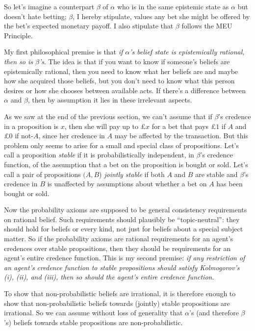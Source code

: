 So let's imagine a counterpart $\beta$ of $\alpha$ who is in the same
epistemic state as $\alpha$ but doesn't hate betting; $\beta$, I
hereby stipulate, values any bet she might be offered by the bet's
expected monetary payoff. I also stipulate that $\beta$ follows the
MEU Principle.

My first philosophical premise is that \emph{if $\alpha$'s belief state is
  epistemically rational, then so is $\beta$'s}. The idea is that if you want to
know if someone's beliefs are epistemically rational, then you need to know what
her beliefs are and maybe how she acquired those beliefs, but you don't need to
know what this person desires or how she chooses between available acts.
If there's a difference between $\alpha$ and $\beta$, then by assumption it lies
in these irrelevant aspects.

As we saw at the end of the previous section, we can't assume that if
$\beta$'s credence in a proposition is $x$, then she will pay up to
£$x$ for a bet that pays £$1$ if $A$ and £0 if not-$A$, since her
credence in $A$ may be affected by the transaction. But this problem
only seems to arise for a small and special class of propositions.
Let's call a proposition \emph{stable} if it is probabilistically
independent, in $\beta$'s credence function, of the assumption that a
bet on the proposition is bought or sold. Let's call a pair of
propositions $(A,B$) \emph{jointly stable} if both $A$ and $B$ are
stable and $\beta$'s credence in $B$ is unaffected by assumptions
about whether a bet on $A$ has been bought or sold.

Now the probability axioms are supposed to be general consistency
requirements on rational belief. Such requirements should plausibly be
``topic-neutral'': they should hold for beliefs or every kind, not
just for beliefs about a special subject matter. So if the probability
axioms are rational requirements for an agent's credences over stable
propositions, then they should be requirements for an agent's
entire credence function. This is my second premise: \emph{if any
  restriction of an agent's credence function to stable propositions
  should satisfy Kolmogorov's (i), (ii), and (iii), then so should the
  agent's entire credence function}.

To show that non-probabilistic beliefs are irrational, it is therefore
enough to show that non-probabilistic beliefs towards (jointly) stable
propositions are irrational. So we can assume without loss of
generality that $\alpha$'s (and therefore $\beta$'s) beliefs towards
stable propositions are non-probabilistic.

